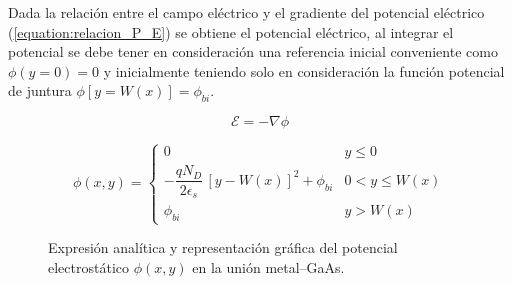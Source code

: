 \documentclass[a4paper]{article}
\begin{document}
Dada la relación entre el campo eléctrico y el gradiente del potencial eléctrico (\ref{equation:relacion_P_E}) se obtiene el potencial eléctrico, al integrar el potencial se debe tener en consideración una referencia inicial conveniente como $\phi (y = 0 ) = 0$ y inicialmente teniendo solo en consideración la función potencial de juntura $\phi [y = W(x) ] = \phi_{bi}$. 

\begin{equation}\label{equation:relacion_P_E}
	\mathcal{E} = - \nabla \phi
\end{equation}

\begin{figure}[H]
	\centering
	
	\begin{minipage}[c]{0.45\textwidth}
		\centering
		\begin{equation}\label{equation:potencial_electrostatico}
			\phi(x,y) =
			\begin{cases}
				0 & y \le 0 \\[4pt]
				-\dfrac{q N_D}{2\epsilon_s}\,[y - W(x)]^2 + \phi_{bi}
				& 0 < y \le W(x) \\[6pt]
				\phi_{bi} & y > W(x)
			\end{cases}
		\end{equation}
	\end{minipage}
	\hfill
	\begin{minipage}[c]{0.5\textwidth}
		\centering
	\end{minipage}
	
	\caption{Expresión analítica y representación gráfica del potencial electrostático $\phi(x,y)$ en la unión metal--GaAs.}
\end{figure}
\end{document}
